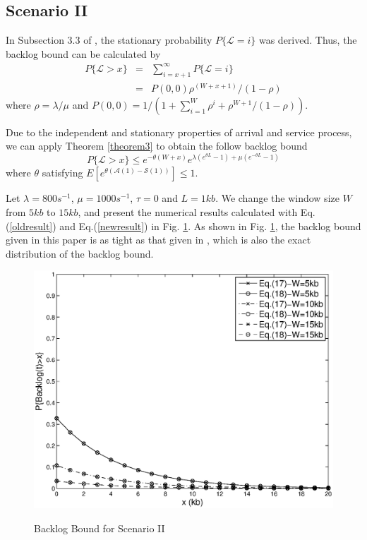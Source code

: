 \documentclass[paper]{ieice}
\begin{document}
\subsection{Scenario II}
In Subsection 3.3 of \cite{jung1996analysis}, the stationary probability $P\{\mathcal{L}=i\}$ was derived. Thus, the backlog bound can be calculated by
\begin{eqnarray}\label{oldresult}
P\{\mathcal{L}>x\}&=&\sum_{i=x+1}^\infty P\{\mathcal{L}=i\}\nonumber\\
&=& P(0,0)\rho^{(W+x+1)}/(1-\rho)
\end{eqnarray}
where $\rho=\lambda/\mu$ and $P(0,0)=1/(1+\sum_{i=1}^W\rho^i+\rho^{W+1}/(1-\rho))$.

Due to the independent and stationary properties of arrival and service process, we can apply Theorem \ref{theorem3} to obtain the follow backlog bound
\begin{equation}\label{newresult}
P\{\mathcal{L}>x\}\leq e^{-\theta(W+x)}e^{\lambda(e^{\theta L}-1)+\mu(e^{-\theta L}-1)}
\end{equation}
where $\theta$ satisfying $E[e^{\theta(\mathcal{A}(1)-\mathcal{S}(1))}]\leq 1$.

Let $\lambda=800s^{-1}$, $\mu=1000s^{-1}$, $\tau=0$ and $L=1kb$. We change the window size $W$ from $5kb$ to $15kb$, and present the numerical results calculated with Eq.(\ref{oldresult}) and Eq.(\ref{newresult}) in Fig. \ref{result3}. As shown in Fig. \ref{result3}, the backlog bound given in this paper is as tight as that given in \cite{jung1996analysis}, which is also the exact distribution of the backlog bound.
\begin{figure}
  \centering
  \includegraphics[scale=0.45]{figures/backlogcomp.eps}\\
  \caption{Backlog Bound for Scenario II}\label{result3}
\end{figure}
\end{document}
